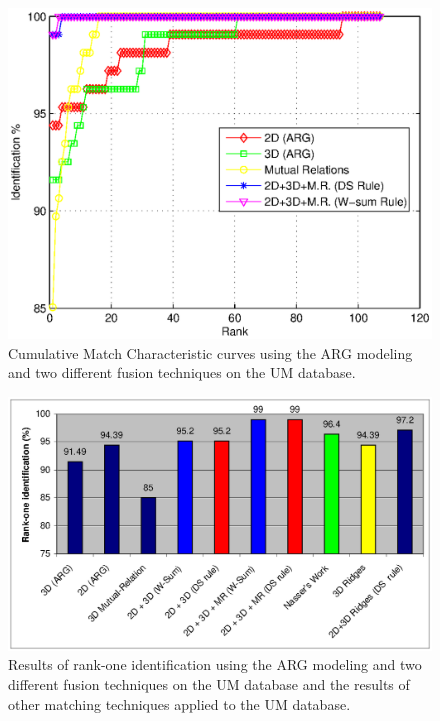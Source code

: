 {\begin{figure}[tbp]
\begin{center}
\includegraphics[scale = .6]{./chapters/figures/cmc_UM.eps}
\caption{Cumulative Match Characteristic curves using the ARG
modeling and two different fusion techniques on the UM
database.}\label{fig_cmc_UM}
\end{center}
\end{figure}

\begin{figure}[tbp]
\begin{center}
  \includegraphics[scale = .6]{./chapters/figures/rank_one_chart_UM.eps}
\caption{Results of rank-one identification using the ARG modeling
and two different fusion techniques on the UM database and the
results of other matching techniques applied to the UM
database.}\label{fig_rank_one_UM}
\end{center}
\end{figure}

}
